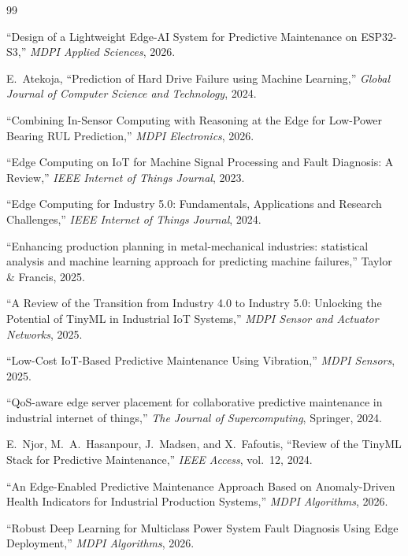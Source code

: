 \documentclass[12pt,a4paper]{report}
\begin{document}
\begin{thebibliography}{99}

 ``Design of a Lightweight Edge-AI System for Predictive Maintenance on ESP32-S3,'' \textit{MDPI Applied Sciences}, 2026.

 E.~Atekoja, ``Prediction of Hard Drive Failure using Machine Learning,'' \textit{Global Journal of Computer Science and Technology}, 2024.

 ``Combining In-Sensor Computing with Reasoning at the Edge for Low-Power Bearing RUL Prediction,'' \textit{MDPI Electronics}, 2026.

 ``Edge Computing on IoT for Machine Signal Processing and Fault Diagnosis: A Review,'' \textit{IEEE Internet of Things Journal}, 2023.

 ``Edge Computing for Industry 5.0: Fundamentals, Applications and Research Challenges,'' \textit{IEEE Internet of Things Journal}, 2024.

 ``Enhancing production planning in metal-mechanical industries: statistical analysis and machine learning approach for predicting machine failures,'' Taylor \& Francis, 2025.

 ``A Review of the Transition from Industry 4.0 to Industry 5.0: Unlocking the Potential of TinyML in Industrial IoT Systems,'' \textit{MDPI Sensor and Actuator Networks}, 2025.

 ``Low-Cost IoT-Based Predictive Maintenance Using Vibration,'' \textit{MDPI Sensors}, 2025.

 ``QoS-aware edge server placement for collaborative predictive maintenance in industrial internet of things,'' \textit{The Journal of Supercomputing}, Springer, 2024.

 E.~Njor, M.~A.~Hasanpour, J.~Madsen, and X.~Fafoutis, ``Review of the TinyML Stack for Predictive Maintenance,'' \textit{IEEE Access}, vol.~12, 2024.

 ``An Edge-Enabled Predictive Maintenance Approach Based on Anomaly-Driven Health Indicators for Industrial Production Systems,'' \textit{MDPI Algorithms}, 2026.

 ``Robust Deep Learning for Multiclass Power System Fault Diagnosis Using Edge Deployment,'' \textit{MDPI Algorithms}, 2026.


\end{thebibliography}
\end{document}
